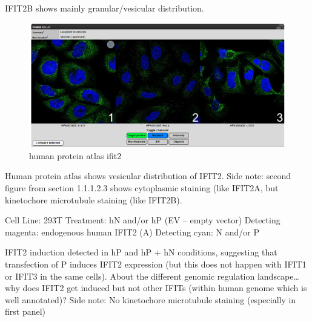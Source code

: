 IFIT2B shows mainly granular/vesicular distribution.

\begin{figure}
    \centering
    \includegraphics[width=1\linewidth]{10. Chapter 5//Figs//04. IFIT2AB Discussion/02. human protein atlas ifit2.png}
    \caption[human protein atlas ifit2]{human protein atlas ifit2}
    \label{fig:human protein atlas ifit2}
\end{figure}

Human protein atlas shows vesicular distribution of IFIT2.
Side note: second figure from section 1.1.1.2.3 shows cytoplasmic staining (like IFIT2A, but kinetochore microtubule staining (like IFIT2B).

Cell Line: 293T \newline
Treatment: hN and/or hP (EV – empty vector) \newline
Detecting magenta: endogenous human IFIT2 (A) \newline
Detecting cyan: N and/or P \newline

IFIT2 induction detected in hP and hP + hN conditions, suggesting that transfection of P induces IFIT2 expression (but this does not happen with IFIT1 or IFIT3 in the same cells).
About the different genomic regulation landscape… why does IFIT2 get induced but not other IFITs (within human genome which is well annotated)? 
Side note: No kinetochore microtubule staining (especially in first panel)

